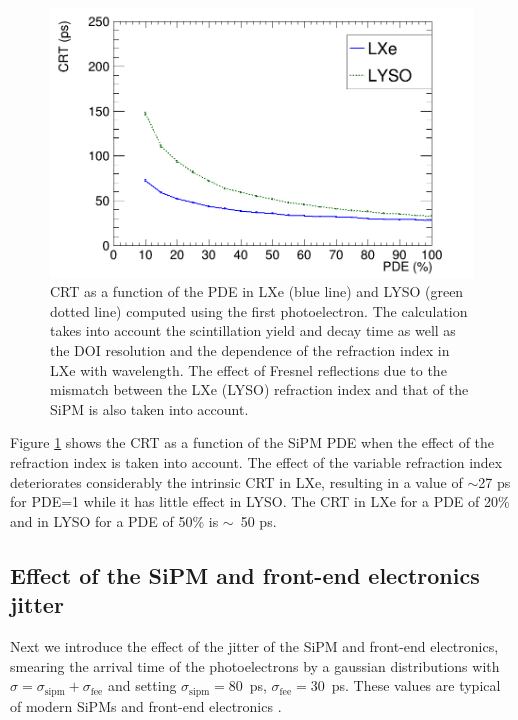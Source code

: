 \documentclass[11pt,a4paper]{article}
\begin{document}
\begin{figure}[!bhtp]
	\centering
	\includegraphics[scale=0.40]{img/CRTvsPDE_phys_LXeLYSONoJitterFstPE.png}
	\caption{\label{fig.crt2} CRT as a function of the PDE in LXe (blue line) and LYSO (green dotted line) computed using the first photoelectron. The calculation takes into account the scintillation yield and decay time as well as the DOI resolution and the dependence of the refraction index in LXe with wavelength. The effect of Fresnel reflections
	due to the mismatch between the LXe (LYSO) refraction index and that of the SiPM is also taken into
	account.  }
\end{figure}

Figure \ref{fig.crt2} shows the CRT as a function of the
 SiPM PDE when the effect of the refraction index is taken into account. 
 The effect of the variable refraction index deteriorates considerably the intrinsic CRT in LXe, resulting in a value of $\sim$27 ps for PDE=1 while it has little effect in LYSO. The CRT in LXe for a PDE of 20\% and in LYSO for a PDE of
 50\% is $\sim$~50 ps.
  
\subsection*{Effect of the SiPM  and front-end electronics jitter}
  Next we introduce the effect of the jitter of the SiPM and front-end electronics, smearing the arrival time of the photoelectrons by a gaussian distributions with $\sigma = \sigma_{\textrm{sipm}} +  \sigma_{\textrm{fee}}$ and setting 
 $\sigma_{\textrm{sipm}} = 80$~ps, $\sigma_{\textrm{fee}} = 30$~ps. These values are typical of modern SiPMs and front-end electronics \cite{FundamentalLimits}. 
 
\end{document}

